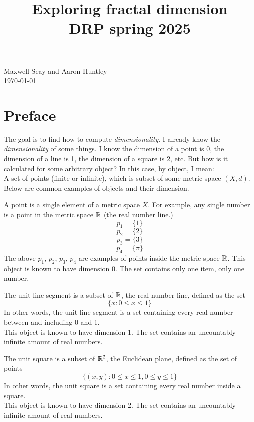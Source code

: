 \documentclass[11pt]{ekblite}
\begin{document}
\title{Exploring fractal dimension\\
DRP spring 2025}
\maketitle
\begin{center}
Maxwell Seay and Aaron Huntley\\
\today
\end{center}

\tableofcontents

\newpage

\section{Preface}
The goal is to find how to compute \textit{dimensionality}. I already know the \textit{dimensionality} of some things. I know the dimension of a point is 0, the dimension of a line is 1, the dimension of a square is 2, etc. But how is it calculated for some arbitrary object? In this case, by object, I mean:
\\[0.2in]A set of points (finite or infinite), which is subset of some metric space $(X,d)$.
\\[0.2in]Below are common examples of objects and their dimension.
\begin{example}[Point]
	A point is a single element of a metric space $X$. For example, any single number is a point in the metric space $\mathbb{R}$ (the real number line.) 
	\[p_1 = \{1\}\]
	\[p_2 = \{2\}\]
	\[p_3 = \{3\}\]
	\[p_4 = \{\pi\}\]
	The above $p_1$, $p_2$, $p_3$, $p_4$ are examples of points inside the metric space $\mathbb{R}$. This object is known to have dimension 0. The set contains only one item, only one number.
\end{example}
\begin{example}
	The unit line segment is a subset of $\mathbb{R}$, the real number line, defined as the set 
	\[\{x : 0 \le x \le 1\}\]
	In other words, the unit line segment is a set containing every real number between and including 0 and 1.
	\\[0.2in]This object is known to have dimension 1. The set contains an uncountably infinite amount of real numbers.
\end{example}
\begin{example}
	The unit square is a subset of $\mathbb{R}^2$, the Euclidean plane, defined as the set of points
	\[\{(x,y) : 0 \le x \le 1, 0 \le y \le 1\}\]
	In other words, the unit square is a set containing every real number inside a square.
	\\[0.2in]This object is known to have dimension 2. The set contains an uncountably infinite amount of real numbers.
\end{example}
\end{document}
